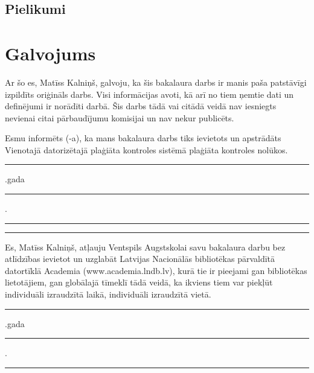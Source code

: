 \documentclass{VEA}
\begin{document}
\renewcommand{\bibname}{\uppercase{Izmantotās literatūras un avotu saraksts}}




\begin{appendices}
\chapter*{Pielikumi}

\end{appendices}

\chapter*{Galvojums}
\sloppy
\noindent Ar šo es, Matīss Kalniņš, galvoju, ka šis bakalaura darbs ir manis paša patstāvīgi 
izpildīts oriģināls darbs. Visi informācijas avoti, kā arī no tiem ņemtie dati un
definējumi ir norādīti darbā. Šis darbs tādā vai citādā veidā nav iesniegts nevienai
citai pārbaudījumu komisijai un nav nekur publicēts.

Esmu informēts (-a), ka mans bakalaura darbs tiks ievietots un apstrādāts
Vienotajā datorizētajā plaģiāta kontroles sistēmā plaģiāta kontroles nolūkos.

\vspace{1in}
\rule{0.5cm}{0.2pt}.gada \rule{1cm}{0.2pt}.\rule{3cm}{0.2pt} \tabto{10cm} \rule{5cm}{0.2pt}
\vspace{0.5in}

Es, Matīss Kalniņš, atļauju Ventspils Augstskolai savu bakalaura darbu bez
atlīdzības ievietot un uzglabāt Latvijas Nacionālās bibliotēkas pārvaldītā datortīklā
Academia (www.academia.lndb.lv), kurā tie ir pieejami gan bibliotēkas lietotājiem,
gan globālajā tīmeklī tādā veidā, ka ikviens tiem var piekļūt individuāli izraudzītā
laikā, individuāli izraudzītā vietā.

\vspace{0.5in}
\vspace{0.5in}
\rule{0.5cm}{0.2pt}.gada \rule{1cm}{0.2pt}.\rule{3cm}{0.2pt} 

\label{LastPage}
\end{document}
